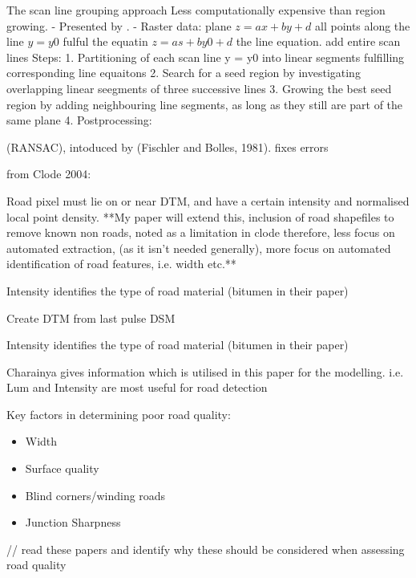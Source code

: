 \begin{multicols}{2}
The scan line grouping approach
Less computationally expensive than region growing.
- Presented by \citep{jiang1992}.
- Raster data: plane $z = ax + by + d$ all points along the line $y = y0$ fulful the equatin $z = as + by0 + d$ the line equation. add entire scan lines
Steps:
1. Partitioning of each scan line y = y0 into linear segments fulfilling corresponding line equaitons
2. Search for a seed region by investigating overlapping linear seegments of three successive lines
3. Growing the best seed region by adding neighbouring line segments, as long as they still are part of the same plane
4. Postprocessing: 

(RANSAC), intoduced by (Fischler and Bolles, 1981). fixes errors

from Clode 2004:

Road pixel must lie on or near DTM, and have a certain intensity and normalised local point density. **My paper will extend this, inclusion of road shapefiles to remove known non roads, noted as a limitation in clode therefore, less focus on automated extraction, (as it isn't needed generally), more focus on automated identification of road features, i.e. width etc.**

Intensity identifies the type of road material (bitumen in their paper)

Create DTM from last pulse DSM

Intensity identifies the type of road material (bitumen in their paper)

Charainya gives information which is utilised in this paper for the modelling. i.e. Lum and Intensity are most useful for road detection


Key factors in determining poor road quality:

\begin{itemize}
    \item Width \citep{taylor2002} \citep{aarts2006}
    \item Surface quality
    \item Blind corners/winding roads \citep{aarts2006}
    \item Junction Sharpness \citep{aarts2006}

\end{itemize}
// read these papers and identify why these should be considered when assessing road quality
\end{multicols}
